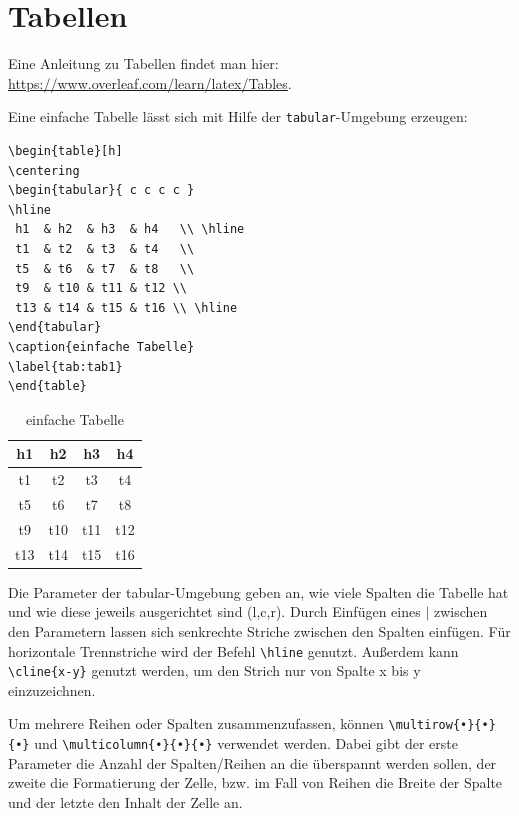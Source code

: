 \section{Tabellen}
Eine Anleitung zu Tabellen findet man hier: \url{https://www.overleaf.com/learn/latex/Tables}. 

Eine einfache Tabelle lässt sich mit Hilfe der \texttt{tabular}-Umgebung erzeugen: 

\begin{center}
\begin{verbatim}
\begin{table}[h]
\centering
\begin{tabular}{ c c c c }
\hline
 h1  & h2  & h3  & h4	\\ \hline
 t1  & t2  & t3  & t4	\\
 t5  & t6  & t7  & t8	\\  
 t9  & t10 & t11 & t12 \\ 
 t13 & t14 & t15 & t16 \\ \hline
\end{tabular}
\caption{einfache Tabelle}
\label{tab:tab1}
\end{table}
\end{verbatim}
\end{center}

\begin{table}[h]
\centering
\begin{tabular}{ c c c c }
\hline
 h1  & h2  & h3  & h4   \\ \hline
 t1  & t2  & t3  & t4   \\
 t5  & t6  & t7  & t8   \\  
 t9  & t10 & t11 & t12 	\\ 
 t13 & t14 & t15 & t16 	\\ \hline
\end{tabular}
\caption{einfache Tabelle}
\label{tab:tab1}
\end{table}

Die Parameter der tabular-Umgebung geben an, wie viele Spalten die Tabelle hat und wie diese jeweils ausgerichtet sind (l,c,r).  Durch Einfügen eines $\vert$ zwischen den Parametern lassen sich senkrechte Striche zwischen den Spalten einfügen. Für horizontale Trennstriche wird der Befehl \verb+\hline+ genutzt. Außerdem kann\verb+ \cline{x-y}+ genutzt werden, um den Strich nur von Spalte x bis y einzuzeichnen.


Um mehrere Reihen oder Spalten zusammenzufassen, können \verb+\multirow{•}{•}{•}+ und \verb+\multicolumn{•}{•}{•}+ verwendet werden. Dabei gibt der erste Parameter die Anzahl der Spalten/Reihen an die überspannt werden sollen, der zweite die Formatierung der Zelle, bzw. im Fall von Reihen die Breite der Spalte und der letzte den Inhalt der Zelle an. 

